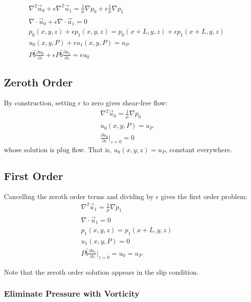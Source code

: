 \documentclass[12pt, a4paper, twoside, openright]{book}
\begin{document}
\begin{gather}
\nabla^2 \vec{u}_0 + \epsilon \nabla^2 \vec{u}_1 =
 \frac{1}{\mu} \nabla p_0 + \epsilon \frac{1}{\mu} \nabla p_1 \\
\nabla \cdot \vec{u}_0 + \epsilon \nabla \cdot \vec{u}_1 = 0  \\
p_0(x,y,z) + \epsilon p_1(x,y,z) = p_0(x+L,y,z) + \epsilon p_1(x+L,y,z) \\
u_0(x,y,P) + \epsilon u_1(x,y,P) = u_P \\ 
 P \hat{b} \frac{\partial u_0}{\partial z}  +
  \epsilon  P \hat{b} \frac{\partial u_1}{\partial z}
= \epsilon u_0
\end{gather}


\subsection{Zeroth Order}

By construction, setting $\epsilon$ to zero gives shear-free flow:
\begin{gather}
\nabla^2 \vec{u}_0  = \frac{1}{\mu} \nabla p_0 \\
u_0(x,y,P) = u_P \\ 
\frac{\partial u_0}{\partial z} \rvert_{z=0} = 0
\end{gather}
whose solution is plug flow.  That is, $u_0(x,y,z) = u_P$, constant everywhere.

\subsection{First Order}

Cancelling the zeroth order terms and dividing by $\epsilon$ gives the first order problem:
\begin{gather}
\nabla^2 \vec{u}_1 = \frac{1}{\mu} \nabla p_1 \\
\nabla \cdot \vec{u}_1 = 0  \\
p_1(x,y,z) = p_1(x+L,y,z) \\
u_1(x,y,P) = 0 \\ 
P \hat{b} \frac{\partial u_1}{\partial z} \rvert_{z=0} = u_0 =  u_P
\end{gather}

Note that the zeroth order solution appears in the slip condition.

\subsubsection{Eliminate Pressure with Vorticity}
\end{document}
